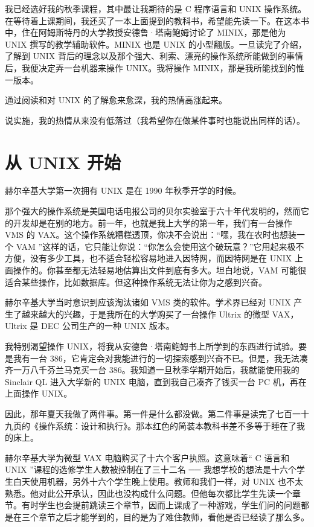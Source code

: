 我已经选好我的秋季课程，其中最让我期待的是 C 程序语言和 UNIX 操作系统。在等待着上课期间，我还买了一本上面提到的教科书，希望能先读一下。在这本书中，住在阿姆斯特丹的大学教授安德鲁·塔南鲍姆讨论了 MINIX，那是他为 UNIX 撰写的教学辅助软件。MINIX 也是 UNIX 的小型翻版。一旦读完了介绍，了解到 UNIX 背后的理念以及那个强大、利索、漂亮的操作系统所能做到的事情后，我便决定弄一台机器来操作 UNIX。我将操作 MINIX，那是我所能找到的惟一版本。

通过阅读和对 UNIX 的了解愈来愈深，我的热情高涨起来。

说实施，我的热情从来没有低落过（我希望你在做某件事时也能说出同样的话）。

 
\section{从 UNIX 开始}

赫尔辛基大学第一次拥有 UNIX 是在 1990 年秋季开学的时候。

那个强大的操作系统是美国电话电报公司的贝尔实验室于六十年代发明的，然而它的开发却是在别的地方。前一年，也就是我上大学的第一年，我们有一台操作 VMS 的 VAX。这个操作系统糟糕透顶，你决不会说出：“嘿，我在农时也想装一个 VAM ”这样的话，它只能让你说：“你怎么会使用这个破玩意？”它用起来极不方便，没有多少工具，也不适合轻松容易地进入因特网，而因特网是在 UNIX 上面操作的。你甚至都无法轻易地估算出文件到底有多大。坦白地说，VAM 可能很适合某些操作，比如数据库。但这种操作系统无法让你为之感到兴奋。

赫尔辛基大学当时意识到应该淘汰诸如 VMS 类的软件。学术界已经对 UNIX 产生了越来越大的兴趣，于是我所在的大学购买了一台操作 Ultrix 的微型 VAX，Ultrix 是 DEC 公司生产的一种 UNIX 版本。

我特别渴望操作 UNIX，将我从安德鲁·塔南鲍姆书上所学到的东西进行试验。要是我有一台 386，它肯定会对我能进行的一切探索感到兴奋不已。但是，我无法凑齐一万八千芬兰马克买一台 386。我知道一旦秋季学期开始后，我就能使用我的 Sinclair QL 进入大学新的 UNIX 电脑，直到我自己凑齐了钱买一台 PC 机，再在上面操作 UNIX。

因此，那年夏天我做了两件事。第一件是什么都没做。第二件事是读完了七百一十九页的《操作系统：设计和执行》。那本红色的简装本教科书差不多等于睡在了我的床上。

赫尔辛基大学为微型 VAX 电脑购买了十六个客户执照。这意味着“ C 语言和 UNIX ”课程的选修学生人数被控制在了三十二名 ── 我想学校的想法是十六个学生白天使用机器，另外十六个学生晚上使用。教师和我们一样，对 UNIX 也不太熟悉。他对此公开承认，因此也没构成什么问题。但他每次都比学生先读一个章节。有时学生也会提前跳读三个章节，因而上课成了一种游戏，学生们问的问题都是在三个章节之后才能学到的，目的是为了难住教师，看他是否已经读了那么多。

